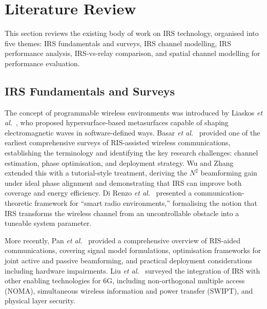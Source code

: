 \documentclass[journal]{IEEEtran} %
\begin{document}
\section{Literature Review}
\label{sec:literature}

This section reviews the existing body of work on IRS technology, organised into five themes: IRS fundamentals and surveys, IRS channel modelling, IRS performance analysis, IRS-vs-relay comparison, and spatial channel modelling for performance evaluation.

\subsection{IRS Fundamentals and Surveys}

The concept of programmable wireless environments was introduced by Liaskos \textit{et al.}~\cite{liaskos2018hypersurface}, who proposed hypersurface-based metasurfaces capable of shaping electromagnetic waves in software-defined ways. Basar \textit{et al.}~\cite{basar2019wireless} provided one of the earliest comprehensive surveys of RIS-assisted wireless communications, establishing the terminology and identifying the key research challenges: channel estimation, phase optimisation, and deployment strategy. Wu and Zhang~\cite{wu2020irs_tutorial} extended this with a tutorial-style treatment, deriving the $N^2$ beamforming gain under ideal phase alignment and demonstrating that IRS can improve both coverage and energy efficiency. Di Renzo \textit{et al.}~\cite{direnzo2020smart} presented a communication-theoretic framework for ``smart radio environments,'' formalising the notion that IRS transforms the wireless channel from an uncontrollable obstacle into a tuneable system parameter.

More recently, Pan \textit{et al.}~\cite{pan2022overview} provided a comprehensive overview of RIS-aided communications, covering signal model formulations, optimisation frameworks for joint active and passive beamforming, and practical deployment considerations including hardware impairments. Liu \textit{et al.}~\cite{liu2021ris_survey} surveyed the integration of IRS with other enabling technologies for 6G, including non-orthogonal multiple access (NOMA), simultaneous wireless information and power transfer (SWIPT), and physical layer security.
\end{document}
